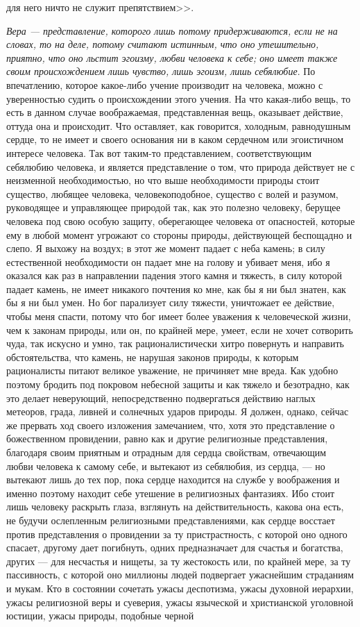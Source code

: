 \documentclass[12pt]{article}
\begin{document}
для него ничто не служит препятствием>>. 

\emph{Вера --- представление, которого лишь потому придерживаются, если не на словах, то на деле, потому считают истинным, что оно утешительно, приятно, что оно льстит эгоизму, любви человека к себе; оно имеет также своим происхождением лишь чувство, лишь эгоизм, лишь себялюбие}. По впечатлению, которое какое-либо учение производит на человека, можно с уверенностью судить о происхождении этого учения. На что какая-либо вещь, то есть в данном случае воображаемая, представленная вещь, оказывает действие, оттуда она и происходит. Что оставляет, как говорится, холодным, равнодушным сердце, то не имеет и своего основания ни в каком сердечном или эгоистичном интересе человека. Так вот таким-то представлением, соответствующим себялюбию человека, и является представление о том, что природа действует не с неизменной необходимостью, но что выше необходимости природы стоит существо, любящее человека, человекоподобное, существо с волей и разумом, руководящее и управляющее природой так, как это полезно человеку, берущее человека под свою особую защиту, оберегающее человека от опасностей, которые ему в любой момент угрожают со стороны природы, действующей беспощадно и слепо. Я выхожу на воздух; в этот же момент падает с неба камень; в силу естественной необходимости он падает мне на голову и убивает меня, ибо я оказался как раз в направлении падения этого камня и тяжесть, в силу которой падает камень, не имеет никакого почтения ко мне, как бы я ни был знатен, как бы я ни был умен. Но бог парализует силу тяжести, уничтожает ее действие, чтобы меня спасти, потому что бог имеет более уважения к человеческой жизни, чем к законам природы, или он, по крайней мере, умеет, если не хочет сотворить чуда, так искусно и умно, так рационалистически хитро повернуть и направить обстоятельства, что камень, не нарушая законов природы, к которым рационалисты питают великое уважение, не причиняет мне вреда. Как удобно поэтому бродить под покровом небесной защиты и как тяжело и безотрадно, как это делает неверующий, непосредственно подвергаться действию наглых метеоров, града, ливней и солнечных ударов природы. Я должен, однако, сейчас же прервать ход своего изложения замечанием, что, хотя это представление о божественном провидении, равно как и другие религиозные представления, благодаря своим приятным и отрадным для сердца свойствам, отвечающим любви человека к самому себе, и вытекают из себялюбия, из сердца, --- но вытекают лишь до тех пор, пока сердце находится на службе у воображения и именно поэтому находит себе утешение в религиозных фантазиях. Ибо стоит лишь человеку раскрыть глаза, взглянуть на действительность, какова она есть, не будучи ослепленным религиозными представлениями, как сердце восстает против представления о провидении за ту пристрастность, с которой оно одного спасает, другому дает погибнуть, одних предназначает для счастья и богатства, других --- для несчастья и нищеты, за ту жестокость или, по крайней мере, за ту пассивность, с которой оно миллионы людей подвергает ужаснейшим страданиям и мукам. Кто в состоянии сочетать ужасы деспотизма, ужасы духовной иерархии, ужасы религиозной веры и суеверия, ужасы языческой и христианской уголовной юстиции, ужасы природы, подобные черной 
\end{document}
